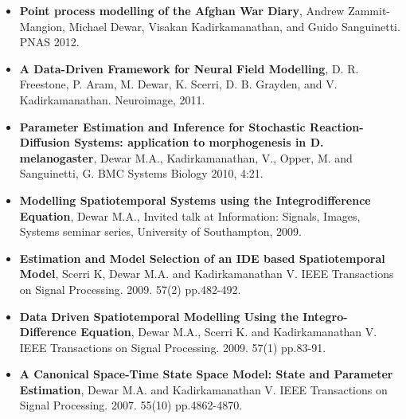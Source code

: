\documentclass{res}
\begin{document}
\begin{resume}
    \begin{itemize}
        \item {\bf Point process modelling of the Afghan War Diary}, Andrew Zammit-Mangion, Michael Dewar, Visakan Kadirkamanathan, and Guido Sanguinetti. PNAS 2012.
        \item {\bf A Data-Driven Framework for Neural Field Modelling}, D. R. Freestone, P. Aram, M. Dewar, K. Scerri, D. B. Grayden, and V. Kadirkamanathan. Neuroimage, 2011.
        \item {\bf Parameter Estimation and Inference for Stochastic Reaction-Diffusion Systems: application to morphogenesis in D. melanogaster}, Dewar M.A., Kadirkamanathan, V., Opper, M. and Sanguinetti, G. BMC Systems Biology 2010, 4:21.
        \item {\bf Modelling Spatiotemporal Systems using the Integrodifference Equation}, Dewar M.A., Invited talk at Information: Signals, Images, Systems seminar series, University of Southampton, 2009.
        \item {\bf Estimation and Model Selection of an IDE based Spatiotemporal Model}, Scerri K, Dewar M.A. and Kadirkamanathan V. IEEE Transactions on Signal Processing. 2009. 57(2) pp.482-492.
        \item {\bf Data Driven Spatiotemporal Modelling Using the Integro-Difference Equation}, Dewar M.A., Scerri K. and Kadirkamanathan V. IEEE Transactions on Signal Processing. 2009. 57(1) pp.83-91. 
        \item {\bf A Canonical Space-Time State Space Model: State and Parameter Estimation}, Dewar M.A. and Kadirkamanathan V. IEEE Transactions on Signal Processing. 2007. 55(10) pp.4862-4870.
    \end{itemize}


\end{resume}
\end{document}

